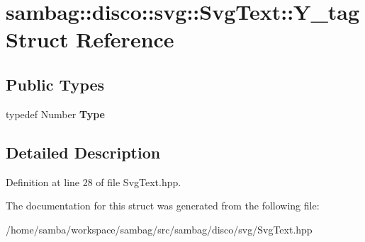\hypertarget{structsambag_1_1disco_1_1svg_1_1_svg_text_1_1_y__tag}{
\section{sambag::disco::svg::SvgText::Y\_\-tag Struct Reference}
\label{structsambag_1_1disco_1_1svg_1_1_svg_text_1_1_y__tag}
}
\subsection*{Public Types}
\begin{DoxyCompactItemize}
\item 
\hypertarget{structsambag_1_1disco_1_1svg_1_1_svg_text_1_1_y__tag_af2182b4de5906a9e8ddc4219211406c5}{
typedef Number {\bfseries Type}}
\label{structsambag_1_1disco_1_1svg_1_1_svg_text_1_1_y__tag_af2182b4de5906a9e8ddc4219211406c5}

\end{DoxyCompactItemize}


\subsection{Detailed Description}


Definition at line 28 of file SvgText.hpp.



The documentation for this struct was generated from the following file:\begin{DoxyCompactItemize}
\item 
/home/samba/workspace/sambag/src/sambag/disco/svg/SvgText.hpp\end{DoxyCompactItemize}
